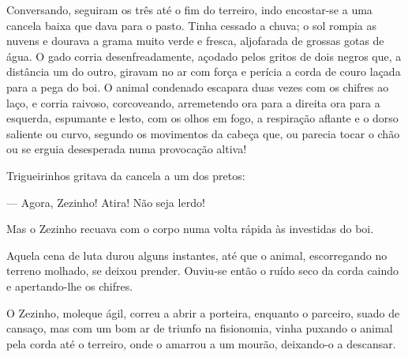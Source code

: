 {





Conversando, seguiram os três até o fim do terreiro,
indo encostar-se a uma cancela baixa que dava para o pasto. Tinha
cessado a chuva; o sol rompia as nuvens e dourava a grama muito verde e
fresca, aljofarada de grossas gotas de água. O gado
corria desenfreadamente, açodado pelos gritos de dois negros que, a
distância um do outro, giravam no ar com força e perícia a corda
de couro laçada para a pega do boi. O animal condenado escapara
duas vezes com os chifres ao laço, e corria raivoso, corcoveando,
arremetendo ora para a direita ora para a esquerda, espumante e lesto,
com os olhos em fogo, a respiração aflante e o dorso saliente ou curvo,
segundo os movimentos da cabeça que, ou parecia tocar o chão ou se
erguia desesperada numa provocação altiva!

Trigueirinhos gritava da cancela a um dos pretos:

--- Agora, Zezinho! Atira! Não seja lerdo!

Mas o Zezinho recuava com o corpo numa volta rápida
às investidas do boi.

Aquela cena de luta durou alguns instantes, até que o
animal, escorregando no terreno molhado, se deixou prender. Ouviu-se
então o ruído seco da corda caindo e apertando-lhe os chifres.

O Zezinho, moleque ágil, correu a abrir a porteira,
enquanto o parceiro, suado de cansaço, mas com um bom ar de triunfo na
fisionomia, vinha puxando o animal pela corda até o terreiro, onde o
amarrou a um mourão, deixando-o a descansar.

}
